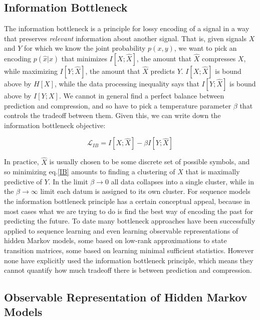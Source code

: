 \documentclass{article} %
\begin{document}
\subsection{Information Bottleneck}

The information bottleneck is a principle for lossy encoding of a signal in a way that preserves {\em relevant} information about another signal.  That is, given signals $X$ and $Y$ for which we know the joint probability $p(x,y)$, we want to pick an encoding $p(\hat{x}|x)$ that minimizes $I[X;\hat{X}]$, the amount that $\hat{X}$ compresses $X$, while maximizing $I[Y;\hat{X}]$, the amount that $\hat{X}$ predicts $Y$.  $I[X;\hat{X}]$ is bound above by $H[X]$, while the data processing inequality says that $I[Y;\hat{X}]$ is bound above by $I[Y;X]$.  We cannot in general find a perfect balance between prediction and compression, and so have to pick a temperature parameter $\beta$ that controls the tradeoff between them.  Given this, we can write down the information bottleneck objective:

\begin{equation}
\mathcal{L}_{IB} = I[X;\hat{X}] - \beta I[Y;\hat{X}]
\label{IB}
\end{equation}

In practice, $\hat{X}$ is usually chosen to be some discrete set of possible symbols, and so minimizing eq.\ref{IB} amounts to finding a clustering of $X$ that is maximally predictive of $Y$.  In the limit $\beta\rightarrow 0$ all data collapses into a single cluster, while in the $\beta\rightarrow\infty$ limit each datum is assigned to its own cluster.  For sequence models the information bottleneck principle has a certain conceptual appeal, because in most cases what we are trying to do is find the best way of encoding the past for predicting the future.  To date many bottleneck approaches have been successfully applied to sequence learning and even learning observable representations of hidden Markov models, some based on low-rank approximations to state transition matrices, some based on learning minimal sufficient statistics.  However none have explicitly used the information bottleneck principle, which means they cannot quantify how much tradeoff there is between prediction and compression.

\subsection{Observable Representation of Hidden Markov Models}
\end{document}
